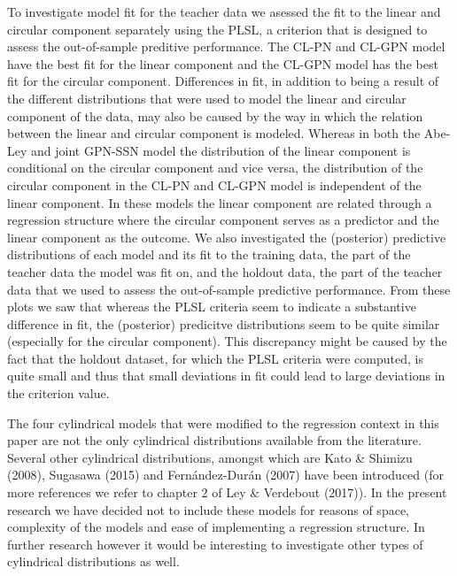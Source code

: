 \documentclass[11pt,]{article}
\begin{document}
To investigate model fit for the teacher data we asessed the fit to the
linear and circular component separately using the PLSL, a criterion
that is designed to assess the out-of-sample preditive performance. The
CL-PN and CL-GPN model have the best fit for the linear component and
the CL-GPN model has the best fit for the circular component.
Differences in fit, in addition to being a result of the different
distributions that were used to model the linear and circular component
of the data, may also be caused by the way in which the relation between
the linear and circular component is modeled. Whereas in both the
Abe-Ley and joint GPN-SSN model the distribution of the linear component
is conditional on the circular component and vice versa, the
distribution of the circular component in the CL-PN and CL-GPN model is
independent of the linear component. In these models the linear
component are related through a regression structure where the circular
component serves as a predictor and the linear component as the outcome.
We also investigated the (posterior) predictive distributions of each
model and its fit to the training data, the part of the teacher data the
model was fit on, and the holdout data, the part of the teacher data
that we used to assess the out-of-sample predictive performance. From
these plots we saw that whereas the PLSL criteria seem to indicate a
substantive difference in fit, the (posterior) predicitve distributions
seem to be quite similar (especially for the circular component). This
discrepancy might be caused by the fact that the holdout dataset, for
which the PLSL criteria were computed, is quite small and thus that
small deviations in fit could lead to large deviations in the criterion
value.

The four cylindrical models that were modified to the regression context
in this paper are not the only cylindrical distributions available from
the literature. Several other cylindrical distributions, amongst which
are Kato \& Shimizu (2008), Sugasawa (2015) and Fernández-Durán (2007)
have been introduced (for more references we refer to chapter 2 of Ley
\& Verdebout (2017)). In the present research we have decided not to
include these models for reasons of space, complexity of the models and
ease of implementing a regression structure. In further research however
it would be interesting to investigate other types of cylindrical
distributions as well.
\end{document}
